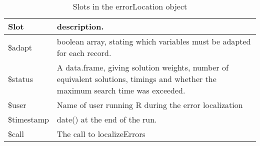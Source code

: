 \begin{table}
\caption{Slots in the {\sf errorLocation} object}
\label{tblErrorLocation}
\begin{tabular}{lp{}}
\hline
Slot          & description. \\
\hline
{\sf \$adapt} & boolean array, stating which variables must be adapted for each record.\\
{\sf \$status}& A {\sf data.frame}, giving solution weights, number of equivalent solutions, timings and whether the maximum search time was exceeded.\\
{\sf \$user}  & Name of user running R during the error localization\\
{\sf \$timestamp} & {\sf date()} at the end of the run.\\
{\sf \$call}  & The call to {\sf localizeErrors}\\
\hline
\end{tabular}
\end{table}
